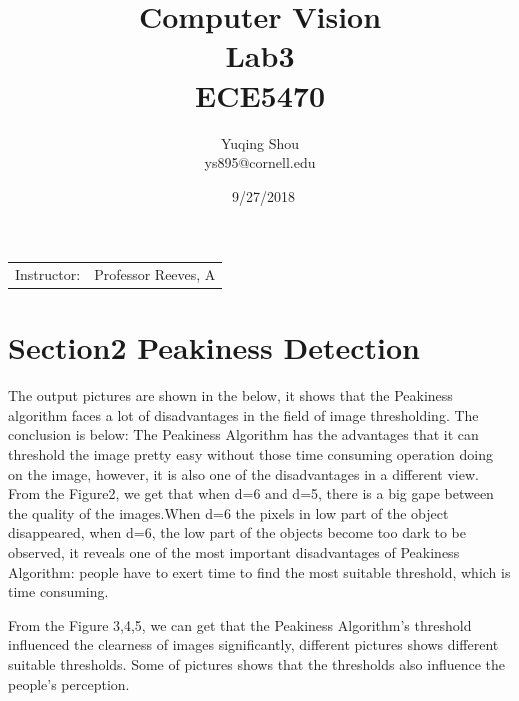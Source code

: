 \documentclass{article}
\title{Computer Vision \\ Lab3 \\ ECE5470} %
\author{Yuqing Shou \\ ys895@cornell.edu} %
\date{\ 9/27/2018} %
\begin{document}
\maketitle %

\begin{center}
\begin{tabular}{l r}
Instructor: & Professor Reeves, A %
\end{tabular}
\end{center}


\newpage



\section*{Section2 Peakiness Detection}
The output pictures are shown in the below, it shows that the Peakiness algorithm faces a lot of disadvantages in the field of
image thresholding. The conclusion is below:
The Peakiness Algorithm has the advantages that it can threshold the image pretty easy without those time consuming operation doing on the image, however, it is also one of the disadvantages in a different view.
From the Figure2, we get that when d=6 and d=5, there is a big gape between the quality of the images.When d=6 the pixels in low part of the object disappeared, when d=6, the low part of the objects become too dark to be observed, it reveals one of the most important disadvantages of Peakiness Algorithm: people have to exert time to find the most suitable threshold, which is time consuming.
\par
\vspace{3mm}
From the Figure 3,4,5, we can get that the Peakiness Algorithm's threshold influenced the clearness of images significantly, different pictures shows different suitable thresholds. Some of pictures shows that the thresholds also influence the people's perception.
\end{document}
